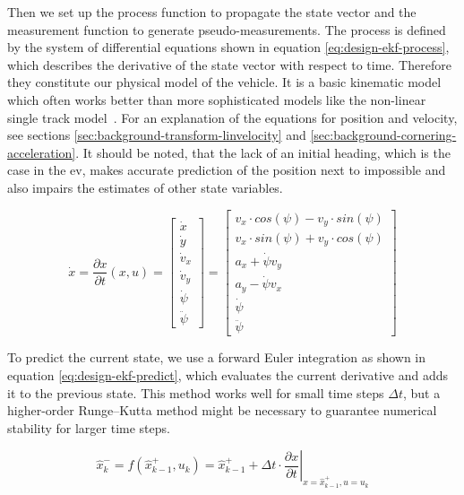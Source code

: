 Then we set up the process function to propagate the state vector and the measurement function to generate pseudo-measurements. The process is defined by the system of differential equations shown in equation \ref{eq:design-ekf-process}, which describes the derivative of the state vector with respect to time. Therefore they constitute our physical model of the vehicle. It is a basic kinematic model which often works better than more sophisticated models like the non-linear single track model~\cite{AlexanderWischnewski.2019}. For an explanation of the equations for position and velocity, see sections \ref{sec:background-transform-linvelocity} and \ref{sec:background-cornering-acceleration}. It should be noted, that the lack of an initial heading, which is the case in the \gls{ev}, makes accurate prediction of the position next to impossible and also impairs the estimates of other state variables.

\begin{equation}\label{eq:design-ekf-process}%
\dot{x} = \frac{\partial x}{\partial t} (x, u)%
= \begin{bmatrix}\dot{x} \\ \dot{y} \\ \dot{v}_x \\ \dot{v}_y \\ \dot{\psi} \\ \ddot{\psi}\end{bmatrix}%
= \begin{bmatrix}v_x \cdot cos(\psi) - v_y \cdot sin(\psi) \\ v_x \cdot sin(\psi) + v_y \cdot cos(\psi) \\ a_x + \dot{\psi}v_y \\ a_y - \dot{\psi}v_x \\ \dot{\psi} \\ \ddot{\psi}\end{bmatrix}%
\end{equation}

To predict the current state, we use a forward Euler integration as shown in equation \ref{eq:design-ekf-predict}, which evaluates the current derivative and adds it to the previous state. This method works well for small time steps $\Delta t$, but a higher-order Runge--Kutta method might be necessary to guarantee numerical stability for larger time steps. 

\begin{equation}\label{eq:design-ekf-predict}%
\hat{x}_k^- = f(\hat{x}_{k-1}^+, u_k) = \hat{x}_{k-1}^+ + \Delta t \cdot \left. \frac{\partial x}{\partial t} \right|_{x = \hat{x}_{k-1}^+, u=u_k}%
\end{equation}

